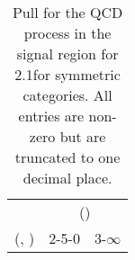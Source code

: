 \begin{table}[h!]
\tiny
\centering
\caption{Pull for the QCD process in the signal region for 2.1\ifb for symmetric categories. All entries are non-zero but are truncated to one decimal place.\label{tab:pullsepnaive_sig_qcd_sym}}
\begin{tabular}
{ccc}
	\hline\hline
	& \multicolumn{2}{c}{\scalht (\gev)} \\ 
	 (\njet,  \nb) & 2-5-0 & 3-$\infty$ \\ [0.8ex] 
\hline
	\hline
	\hline
\end{tabular}
\end{table}
